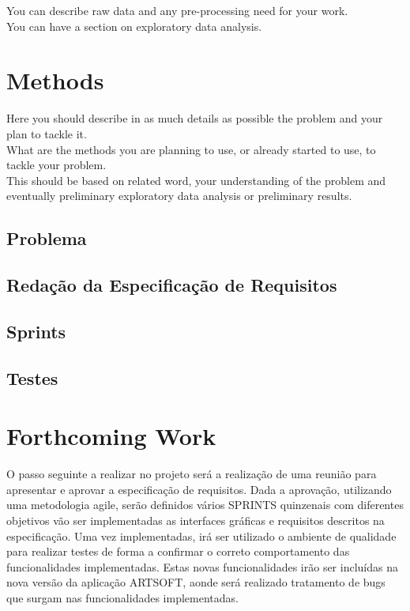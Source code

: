 \documentclass[sigplan]{acmart}
\begin{document}
You can describe raw data and any pre-processing need for your work. \\

You can have a section on exploratory data analysis. \\

\section{Methods} \label{sec:methods}

Here you should describe in as much details as possible the problem and your plan to tackle it. \\

What are the methods you are planning to use, or already started to use, to tackle your problem. \\

This should be based on related word, your understanding of the problem and eventually preliminary exploratory data analysis or preliminary results.

\subsection{Problema} %

\subsection{Redação da Especificação de Requisitos}

\subsection{Sprints}

\subsection{Testes}

\section{Forthcoming Work} \label{sec:forthcomingwork}


O passo seguinte a realizar no projeto será a realização de uma reunião para apresentar e aprovar a especificação de requisitos. Dada a aprovação, utilizando uma metodologia agile, serão definidos vários SPRINTS quinzenais com diferentes objetivos vão ser implementadas as interfaces gráficas e requisitos descritos na especificação. Uma vez implementadas, irá ser utilizado o ambiente de qualidade para realizar testes de forma a confirmar o correto comportamento das funcionalidades implementadas. Estas novas funcionalidades irão ser incluídas na nova versão da aplicação ARTSOFT, aonde será realizado tratamento de bugs que surgam nas funcionalidades implementadas.



\end{document}
